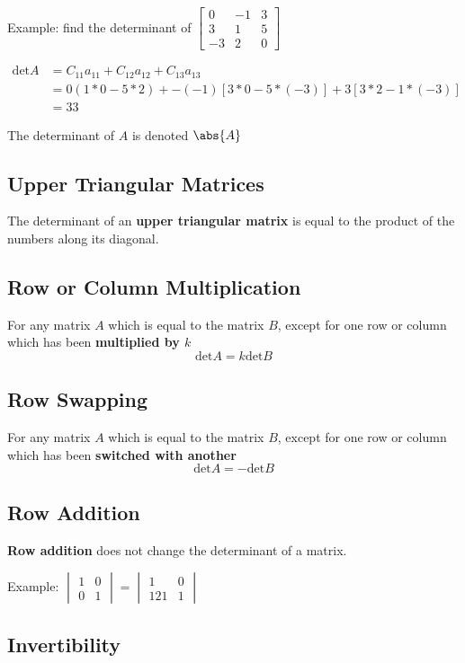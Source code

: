 \documentclass[12pt]{article}
\begin{document}
Example: find the determinant of $\begin{bmatrix}0&-1&3\\3&1&5\\-3&2&0\end{bmatrix}$

\begin{align*}
\text{det}A &= C_{11}a_{11} + C_{12}a_{12} + C_{13}a_{13}\\
&= 0(1*0-5*2) + -(-1)[3*0-5*(-3)] + 3[3*2-1*(-3)]\\
&= 33
\end{align*}

The determinant of $A$ is denoted $\abs{A}$

\subsection*{Upper Triangular Matrices}
The determinant of an {\bf upper triangular matrix} is equal to the product of the numbers along its diagonal.

\subsection*{Row or Column Multiplication}
For any matrix $A$ which is equal to the matrix $B$, except for one row or column which has been {\bf multiplied by $k$} \[ \text{det}A = k\text{det}B \]

\subsection*{Row Swapping}
For any matrix $A$ which is equal to the matrix $B$, except for one row or column which has been {\bf switched with another} \[ \text{det}A = -\text{det}B \]

\subsection*{Row Addition}
{\bf Row addition} does not change the determinant of a matrix.

Example: $\begin{vmatrix}1&0\\0&1\end{vmatrix} = \begin{vmatrix}1&0\\121&1\end{vmatrix}$

\subsection*{Invertibility}
\end{document}
